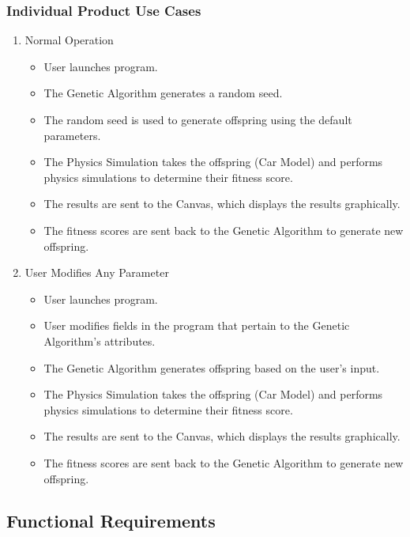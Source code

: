 \documentclass[12pt, titlepage]{article}
\begin{document}
\subsubsection{Individual Product Use Cases}
\begin{enumerate}

\item{Normal Operation}

\begin{itemize}
\item{User launches program.}
\item{The Genetic Algorithm generates a random seed.}
\item{The random seed is used to generate offspring using the default 
parameters.}
\item{The Physics Simulation takes the offspring (Car Model) and performs 
physics simulations to determine their fitness score.}
\item{The results are sent to the Canvas, which displays the results 
graphically.}
\item{The fitness scores are sent back to the Genetic Algorithm to generate new 
offspring.}
\end{itemize}

\item{User Modifies Any Parameter}
\begin{itemize}
\item{User launches program.}
\item{User modifies fields in the program that pertain to the Genetic 
Algorithm's attributes.}
\item{The Genetic Algorithm generates offspring based on the user's input.}
\item{The Physics Simulation takes the offspring (Car Model) and performs 
physics simulations to determine their fitness score.}
\item{The results are sent to the Canvas, which displays the results 
graphically.}
\item{The fitness scores are sent back to the Genetic Algorithm to generate new 
offspring.}
\end{itemize}

\end{enumerate}

\subsection{Functional Requirements}

\end{document}
